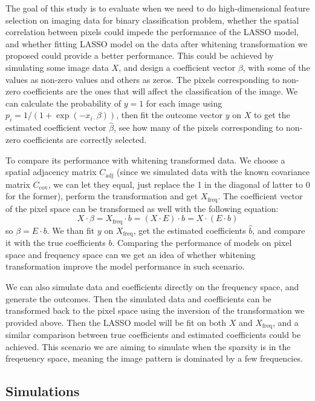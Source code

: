 \documentclass[12pt]{article}
\begin{document}
The goal of this study is to evaluate when we need to do high-dimensional feature selection on imaging data for binary classification problem, whether the spatial correlation between pixels could impede the performance of the LASSO model, and whether fitting LASSO model on the data after whitening transformation we proposed could provide a better performance. This could be achieved by simulating some image data \( X \), and design a coefficient vector \( \beta \), with some of the values as non-zero values and others as zeros. The pixels corresponding to non-zero coefficients are the ones that will affect the classification of the image. We can calculate the probability of \( y = 1 \) for each image using \( p_i = 1 / (1 + \exp(-x_{i \cdot} \beta)) \), then fit the outcome vector \( y \) on \( X \) to get the estimated coefficient vector \( \hat{\beta} \), see how many of the pixels corresponding to non-zero coefficients are correctly selected.

To compare its performance with whitening transformed data. We choose a spatial adjacency matrix \( C_{\text{adj}} \) (since we simulated data with the known covariance matrix \( C_{\text{cov}} \), we can let they equal, just replace the 1 in the diagonal of latter to 0 for the former), perform the transformation and get \( X_{\text{freq}} \). The coefficient vector of the pixel space can be transformed as well with the following equation:
\[
  X \cdot \beta = X_{\text{freq}} \cdot b = (X \cdot E) \cdot b = X \cdot (E \cdot b)
\]
so \( \beta = E \cdot b \). We than fit \( y \) on \( X_{\text{freq}} \), get the estimated coefficients \( \hat{b} \), and compare it with the true coefficients \( b \). Comparing the performance of models on pixel space and frequency space can we get an idea of whether whitening transformation improve the model performance in such scenario.

We can also simulate data and coefficients directly on the frequency space, and generate the outcomes. Then the simulated data and coefficients can be transformed back to the pixel space using the inversion of the transformation we provided above. Then the LASSO model will be fit on both \( X \) and \( X_{\text{freq}} \), and a similar comparison between true coefficients and estimated coefficients could be achieved. This scenario we are aiming to simulate when the sparsity is in the freqeuency space, meaning the image pattern is dominated by a few frequencies.


\subsection{Simulations}
\end{document}
